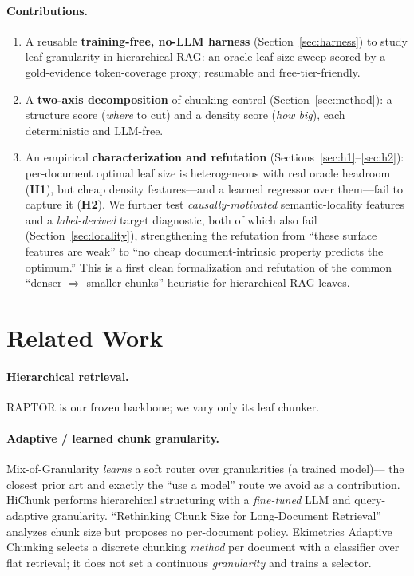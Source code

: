 \documentclass[11pt]{article}
\begin{document}
\paragraph{Contributions.}
\begin{enumerate}
  \item A reusable \textbf{training-free, no-LLM harness} (Section~\ref{sec:harness})
  to study leaf granularity in hierarchical RAG: an oracle leaf-size sweep scored
  by a gold-evidence token-coverage proxy; resumable and free-tier-friendly.
  \item A \textbf{two-axis decomposition} of chunking control
  (Section~\ref{sec:method}): a structure score (\emph{where} to cut) and a
  density score (\emph{how big}), each deterministic and LLM-free.
  \item An empirical \textbf{characterization and refutation}
  (Sections~\ref{sec:h1}--\ref{sec:h2}): per-document optimal leaf size is
  heterogeneous with real oracle headroom (\textbf{H1}), but cheap density
  features---and a learned regressor over them---fail to capture it (\textbf{H2}).
  We further test \emph{causally-motivated} semantic-locality features and a
  \emph{label-derived} target diagnostic, both of which also fail
  (Section~\ref{sec:locality}), strengthening the refutation from ``these surface
  features are weak'' to ``no cheap document-intrinsic property predicts the
  optimum.'' This is a first clean formalization and refutation of the common
  ``denser $\Rightarrow$ smaller chunks'' heuristic for hierarchical-RAG leaves.
\end{enumerate}

\section{Related Work}
\label{sec:related}

\paragraph{Hierarchical retrieval.} RAPTOR \cite{sarthi2024raptor} is our frozen
backbone; we vary only its leaf chunker.

\paragraph{Adaptive / learned chunk granularity.} Mix-of-Granularity
\cite{mog2024} \emph{learns} a soft router over granularities (a trained model)---
the closest prior art and exactly the ``use a model'' route we avoid as a
contribution. HiChunk \cite{hichunk2025} performs hierarchical structuring with a
\emph{fine-tuned} LLM and query-adaptive granularity. ``Rethinking Chunk Size for
Long-Document Retrieval'' \cite{rethink2025} analyzes chunk size but proposes no
per-document policy. Ekimetrics Adaptive Chunking \cite{ekimetrics} selects a
discrete chunking \emph{method} per document with a classifier over flat
retrieval; it does not set a continuous \emph{granularity} and trains a selector.
\end{document}

